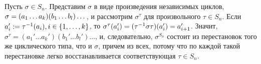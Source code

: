 \begin{example}
	Пусть $\sigma \in S_n$. Представим $\sigma$ в виде произведения независимых циклов, $\sigma \hm= (a_1\dotsc a_k)(b_1\dotsc b_l)\dotsc$, и рассмотрим $\sigma^\tau$ для произвольного $\tau \in S_n$. Если $a_i' := \tau^{-1}(a_i), i \hm\in \{1, \dots, k\}$, то $\sigma^\tau(a_i') \hm= (\tau^{-1}\sigma\tau)(a_i') = a_{i + 1}'$. Значит, $\sigma^\tau = (a_1'\dotsc a_k')(b_1'\dotsc b_l')\dotsc$, и, следовательно, $\sigma^{S_n}$ состоит из перестановок того же циклического типа, что и $\sigma$, причем из всех, потому что по каждой такой перестановке легко восстанавливается соответствующая $\tau \in S_n$.
\end{example}